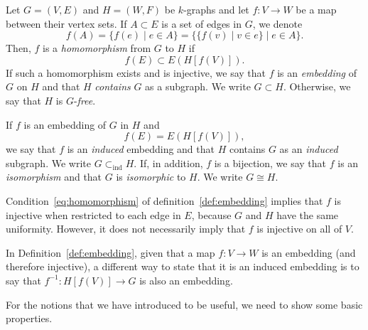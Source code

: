 \begin{definition} \label{def:embedding}
    Let $G = (V, E)$ and $H = (W, F)$ be $k$-graphs and let $f: V \to W$ be a map
    between their vertex sets.
    If $A \subset E$ is a set of edges in $G$, we denote
    \[
        f(A) = \{f(e) \mid e \in A\} = \{\{f(v) \mid v \in e\} \mid e \in A\}.
    \]
    Then, $f$ is a \emph{homomorphism} from $G$ to $H$ if
    \begin{equation}
        \label{eq:homomorphism}
        f(E) \subset E(H[f(V)]).
    \end{equation}
    If such a homomorphism exists
    and is injective, we say that $f$ is an \emph{embedding} of $G$ on $H$
    and that $H$ \emph{contains} $G$ as a subgraph.
    We write $G \subset H$.
    Otherwise, we say that $H$ is $G$-\emph{free}.

    If $f$ is an embedding of $G$ in $H$ and
    \begin{equation}
        \label{eq:induced_embedding}
        f(E) = E(H[f(V)]),
    \end{equation}
    we say that $f$ is an \emph{induced} embedding
    and that $H$ contains $G$ as an \emph{induced} subgraph.
    We write $G \subset_{\text{ind}} H$.
    If, in addition, $f$ is a bijection, we say that $f$ is an \emph{isomorphism}
    and that $G$ is \emph{isomorphic} to $H$.
    We write $G \cong H$.
\end{definition}

\begin{remark}
    Condition~\eqref{eq:homomorphism} of definition~\ref{def:embedding}
    implies that $f$ is injective
    when restricted to each edge in $E$, because $G$ and $H$ have the same uniformity.
    However, it does not necessarily imply that $f$ is injective on all of $V$.
\end{remark}

\begin{remark} \label{rem:inverse_embedding}
    In Definition~\ref{def:embedding}, given that a map $f: V \to W$ is an embedding
    (and therefore injective),
    a different way to state that it is an induced embedding is to say that
    $f^{-1}: H[f(V)] \to G$ is also an embedding.
\end{remark}

For the notions that we have introduced to be useful,
we need to show some basic properties.

